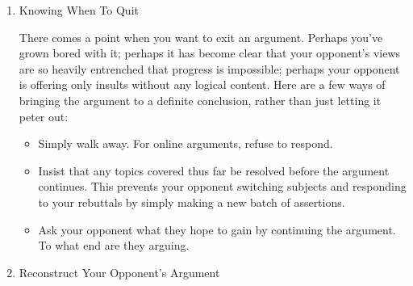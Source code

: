 \documentclass{article}
\begin{document}
\begin{enumerate}
Finally, there is a delicate ethical issue to consider when arguing.
Every so often you find yourself locking horns with someone who appears
to have a fairly shaky grip on reality. I'm not referring to simple
eccentricity or religious fervor, but psychiatric illness. For examples,
you can refer to some of the emails received by the James Randi
Educational Foundation  \footnote{\url{http://www.randi.org/}} (JREF) in response to their million dollar
challenge. James Randi is a well known skeptic and magician. Since 1994,
the JREF has offered a prize of one million dollars to anyone able to
demonstrate paranormal or supernatural abilities or phenomena under
controlled observational conditions. To date, no one has successfully
claimed that prize. But some of the applications \footnote{\url{http://forums.randi.org/forumdisplay.php?f=43}} they receive
suggest that the respondent is unwell, perhaps delusional. If you should
find yourself in online discussion with someone whom you suspect is
unencumbered by the restrictions of rational thought, then perhaps the
best you can do is exit the discussion immediately. To continue is to
risk antagonizing someone who may be genuinely dangerous. This is one of
the prime reasons for conducting online arguments anonymously, where
possible.

\item Knowing When To Quit
\label{sec:orgheadline87}

There comes a point when you want to exit an argument. Perhaps you've
grown bored with it; perhaps it has become clear that your opponent's
views are so heavily entrenched that progress is impossible; perhaps
your opponent is offering only insults without any logical content. Here
are a few ways of bringing the argument to a definite conclusion, rather
than just letting it peter out:

\begin{itemize}
\item Simply walk away. For online arguments, refuse to respond.
\item Insist that any topics covered thus far be resolved before the
argument continues. This prevents your opponent switching subjects
and responding to your rebuttals by simply making a new batch of
assertions.
\item Ask your opponent what they hope to gain by continuing the argument.
To what end are they arguing.
\end{itemize}

\item Reconstruct Your Opponent's Argument
\label{sec:orgheadline88}


\end{enumerate}
\end{document}
